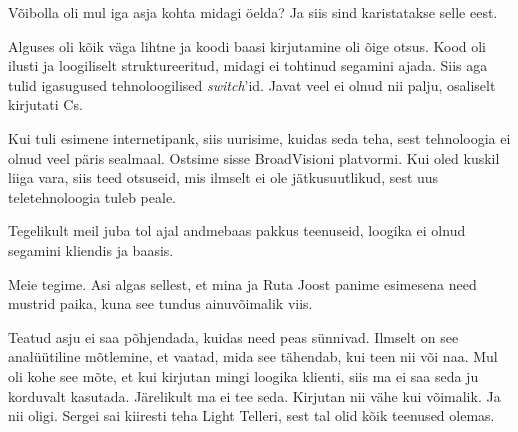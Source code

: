 
Võibolla oli mul iga asja kohta midagi öelda? Ja siis sind karistatakse selle eest. 


Alguses oli kõik väga lihtne ja koodi baasi kirjutamine oli õige otsus. Kood oli ilusti ja loogiliselt
struktureeritud, midagi ei tohtinud segamini ajada. Siis aga tulid igasugused tehnoloogilised \emph{switch}'id. Javat veel ei olnud 
nii palju, osaliselt kirjutati Cs. 

Kui tuli esimene internetipank, siis 
uurisime, kuidas seda teha, sest tehnoloogia ei olnud veel päris sealmaal. Ostsime sisse BroadVisioni platvormi. Kui oled kuskil liiga vara, siis teed otsuseid, mis 
ilmselt ei ole jätkusuutlikud, sest uus teletehnoloogia tuleb peale. 


Tegelikult meil juba tol ajal andmebaas pakkus teenuseid, loogika ei olnud 
segamini kliendis ja baasis. 


Meie tegime. Asi algas sellest, et mina ja Ruta Joost 
panime esimesena need mustrid paika, kuna see tundus ainuvõimalik viis. 


Teatud asju ei saa põhjendada, kuidas need peas sünnivad. Ilmselt on see analüütiline mõtlemine, et vaatad, mida see tähendab, 
kui teen nii või naa. Mul oli kohe see mõte, et kui kirjutan 
mingi loogika klienti, siis ma ei saa seda ju korduvalt kasutada. Järelikult ma 
ei tee seda. Kirjutan nii vähe kui võimalik. Ja nii oligi. 
Sergei sai kiiresti teha Light Telleri, sest tal 
olid kõik teenused olemas. 

